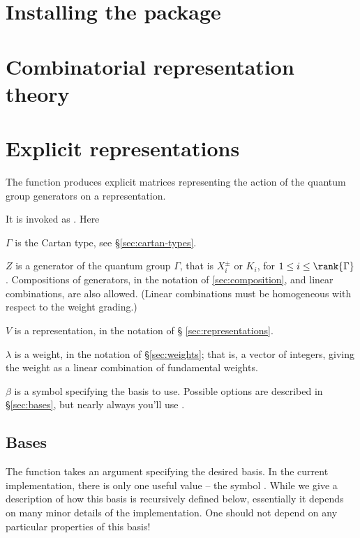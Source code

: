 
\section{Installing the  package}

\section{Combinatorial representation theory}

\section{Explicit representations}
The function  produces explicit matrices
representing the action of the quantum group generators on a
representation.

It is invoked as . Here
\begin{defn}
\item[$\Gamma$] is the Cartan type, see \S \ref{sec:cartan-types}.
\item[$Z$] is a generator of the quantum group $\Gamma$, that is
$X_i^\pm$ or $K_i$, for $1 \leq i \leq \rank{\Gamma}$. Compositions of
generators, in the notation of \ref{sec:composition}, and linear
combinations, are also allowed. (Linear combinations must be homogeneous
with respect to the weight grading.)
\item[$V$] is a representation, in the notation of \S
\ref{sec:representations}.
\item[$\lambda$] is a weight, in the notation of \S \ref{sec:weights};
that is, a vector of integers, giving the weight as a linear combination
of fundamental weights.
\item[$\beta$] is a symbol specifying the basis to use. Possible options are described in \S \ref{sec:bases}, but nearly always you'll use
.
\end{defn}

\subsection{Bases}
The function  takes an argument specifying the
desired basis. In the current implementation, there is only one useful
value -- the symbol . While we give a description
of how this basis is recursively defined below, essentially it depends on
many minor details of the implementation. One should not depend on any
particular properties of this basis!

